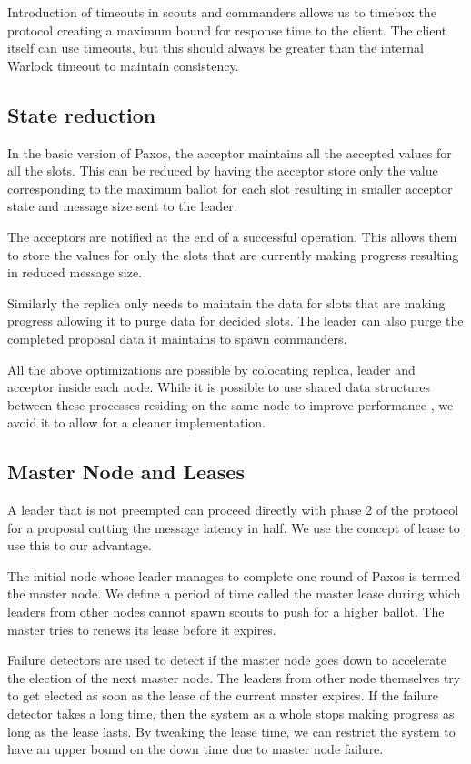 Introduction of timeouts in scouts and commanders allows us to timebox the
protocol creating a maximum bound for response time to the client. The client
itself can use timeouts, but this should always be greater than the internal
Warlock timeout to maintain consistency.

\subsection{State reduction}

In the basic version of Paxos, the acceptor maintains all the accepted values
for all the slots. This can be reduced by having the acceptor store only the
value corresponding to the maximum ballot for each slot resulting in smaller
acceptor state and  message size sent to the leader.

The acceptors are notified at the end of a successful operation. This allows
them to store the values for only the slots that are currently making
progress resulting in reduced  message size.

Similarly the replica only needs to maintain the data for slots that are
making progress allowing it to purge data for decided slots. The leader can
also purge the completed proposal data it maintains to spawn commanders.

All the above optimizations are possible by colocating replica, leader
and acceptor inside each node. While it is possible to use shared
data structures between these processes residing on the same node to improve
performance , we avoid it to allow for a cleaner implementation.

\subsection{Master Node and Leases}
\label{section:a.n.d.lease}

A leader that is not preempted can proceed directly with phase 2 of the
protocol for a proposal cutting the message latency in half. We use the
concept of lease to use this to our advantage.

The initial node whose leader manages to complete one round of Paxos is
termed the master node. We define a period of time called the master lease
during which leaders from other nodes cannot spawn scouts to push for a
higher ballot. The master tries to renews its lease before it expires.

Failure detectors%
are used to detect if the master node goes down to accelerate the election
of the next master node. The leaders from other node themselves try to
get elected as soon as the lease of the current master expires. If the
failure detector takes a long time, then the system as a whole
stops making progress as long as the lease lasts. By tweaking the lease
time, we can restrict the system to have an upper bound on the down time
due to master node failure.

